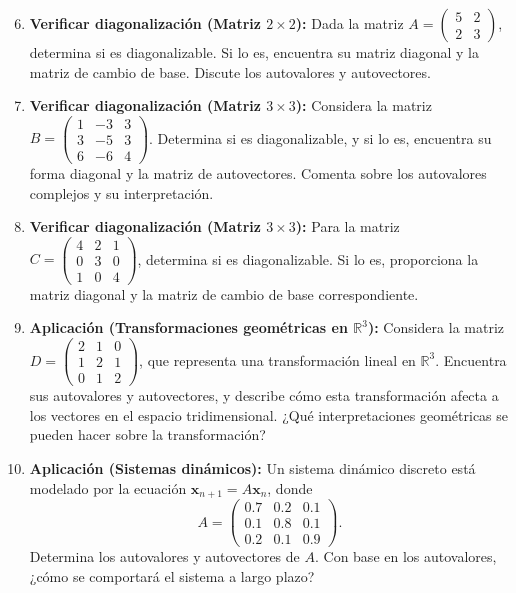 \documentclass{article}
\begin{document}
\begin{enumerate}
    \setcounter{enumi}{5}

    \item \textbf{Verificar diagonalización (Matriz \(2 \times 2\)):} 
    Dada la matriz \( A = \begin{pmatrix} 5 & 2 \\ 2 & 3 \end{pmatrix} \), determina si es diagonalizable. Si lo es, encuentra su matriz diagonal y la matriz de cambio de base. Discute los autovalores y autovectores.

    \item \textbf{Verificar diagonalización (Matriz \(3 \times 3\)):} 
    Considera la matriz \( B = \begin{pmatrix} 1 & -3 & 3 \\ 3 & -5 & 3 \\ 6 & -6 & 4 \end{pmatrix} \). Determina si es diagonalizable, y si lo es, encuentra su forma diagonal y la matriz de autovectores. Comenta sobre los autovalores complejos y su interpretación.

    \item \textbf{Verificar diagonalización (Matriz \(3 \times 3\)):} 
    Para la matriz \( C = \begin{pmatrix} 4 & 2 & 1 \\ 0 & 3 & 0 \\ 1 & 0 & 4 \end{pmatrix} \), determina si es diagonalizable. Si lo es, proporciona la matriz diagonal y la matriz de cambio de base correspondiente.

    \item \textbf{Aplicación (Transformaciones geométricas en \( \mathbb{R}^3 \)):} 
    Considera la matriz \( D = \begin{pmatrix} 2 & 1 & 0 \\ 1 & 2 & 1 \\ 0 & 1 & 2 \end{pmatrix} \), que representa una transformación lineal en \( \mathbb{R}^3 \). Encuentra sus autovalores y autovectores, y describe cómo esta transformación afecta a los vectores en el espacio tridimensional. ¿Qué interpretaciones geométricas se pueden hacer sobre la transformación?

    \item \textbf{Aplicación (Sistemas dinámicos):} 
    Un sistema dinámico discreto está modelado por la ecuación \( \mathbf{x}_{n+1} = A \mathbf{x}_n \), donde 
    \[
    A = \begin{pmatrix} 0.7 & 0.2 & 0.1 \\ 0.1 & 0.8 & 0.1 \\ 0.2 & 0.1 & 0.9 \end{pmatrix}.
    \]
    Determina los autovalores y autovectores de \( A \). Con base en los autovalores, ¿cómo se comportará el sistema a largo plazo?
\end{enumerate}
\end{document}
